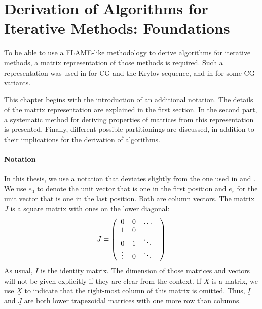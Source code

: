 \chapter{Derivation of Algorithms for Iterative Methods: Foundations}
\label{chap:iterativeMethodsIntro}



To be able to use a FLAME-like methodology to derive algorithms for iterative methods, a matrix representation of those methods is required. Such a representation was used in \cite{eijkhout:CGderivation} for CG and the Krylov sequence, and in \cite{eijkhout:CGvariants2} for some CG variants.

This chapter begins with the introduction of an additional notation. The details of the matrix representation are explained in the first section. In the second part, a systematic method for deriving properties of matrices from this representation is presented. Finally, different possible partitionings are discussed, in addition to their implications for the derivation of algorithms.

\subsubsection{Notation}

In this thesis, we use a notation that deviates slightly from the one used in \cite{eijkhout:CGvariants2} and \cite{eijkhout:CGderivation}. We use $e_0$ to denote the unit vector that is one in the first position and $e_r$ for the unit vector that is one in the last position. Both are column vectors. The matrix $J$ is a square matrix with ones on the lower diagonal:
%
$$
J = \left(
\begin{array}{c@{\;\;}@{\;\;}c@{\;\;}@{\;\;}c@{\;\;}@{\;\;}c} 
0 & 0 & \hdots \\
1 & 0 & \\
0 & 1 & \ddots \\
\vdots & 0 & \ddots
\end{array} 
\right)
$$
%
 As usual, $I$ is the identity matrix. The dimension of those matrices and vectors will not be given explicitly if they are clear from the context. If $X$ is a matrix, we use $\underline{X}$ to indicate that the right-most column of this matrix is omitted. Thus, $\underline{I}$ and $\underline{J}$ are both lower trapezoidal matrices with one more row than columns.

